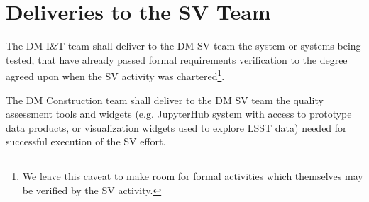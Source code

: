 \section{Deliveries to the SV Team}

The DM I\&T team shall deliver to the DM SV team the system or systems being
tested, that have already passed formal requirements verification to the
degree agreed upon when the SV activity was chartered\footnote{We leave this
caveat to make room for formal activities which themselves may be verified
by the SV activity.}.

The DM Construction team shall deliver to the DM SV team the quality
assessment tools and widgets (e.g. JupyterHub system with access to
prototype data products, or visualization widgets used to explore LSST
data) needed for successful execution of the SV effort.
